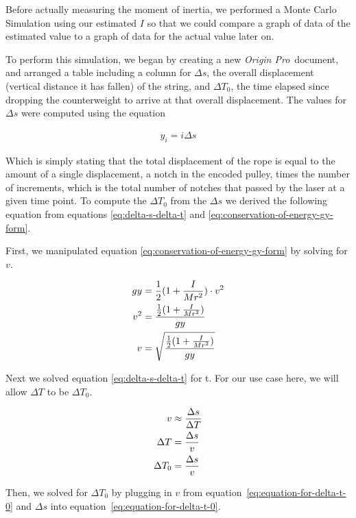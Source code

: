 \documentclass[coverpage]{article}
\newcommand{\softwareText}[1]{\textit{#1}\texttrademark}
\newcommand{\origin}{\softwareText{Origin Pro}}
\begin{document}
	Before actually measuring the moment of inertia, we performed a Monte Carlo Simulation using our estimated $I$ so that we could compare a graph of data of the estimated value to a graph of data for the actual value later on.
	
	To perform this simulation, we began by creating a new \origin~document, and arranged a table including a column for $\Delta{s}$, the overall displacement (vertical distance it has fallen) of the string, and $\Delta{T_0}$, the time elapsed since dropping the counterweight to arrive at that overall displacement. The values for $\Delta{s}$ were computed using the equation
	
	\begin{align}
		y_i=i \Delta{s}
	\end{align}

	Which is simply stating that the total displacement of the rope is equal to the amount of a single displacement, a notch in the encoded pulley, times the number of increments, which is the total number of notches that passed by the laser at a given time point. To compute the $\Delta{T_0}$ from the $\Delta{s}$ we derived the following equation from equations \ref{eq:delta-s-delta-t} and \ref{eq:conservation-of-energy-gy-form}.
	
	First, we manipulated equation \ref{eq:conservation-of-energy-gy-form} by solving for $v$.
	
	\begin{align}
		gy&=\frac{1}{2}(1 + \frac{I}{Mr^2}) \cdot v^2 \notag \\
		v^2&=\frac{\frac{1}{2}(1 + \frac{I}{Mr^2})}{gy} \notag \\
		v&=\sqrt{\frac{\frac{1}{2}(1 + \frac{I}{Mr^2})}{gy}} \label{eq:equation-for-v}
	\end{align}
	
	Next we solved equation \ref{eq:delta-s-delta-t} for t. For our use case here, we will allow $\Delta{T}$ to be $\Delta{T_0}$.
	
	\begin{align}
		v&\approx \frac{\Delta{s}}{\Delta{T}} \notag \\
		\Delta{T}&= \frac{\Delta{s}}{v} \notag \\
		\Delta{T_0}&= \frac{\Delta{s}}{v} \label{eq:equation-for-delta-t-0}
	\end{align}
	
	Then, we solved for $\Delta{T_0}$ by plugging in $v$ from equation~\ref{eq:equation-for-delta-t-0} and $\Delta{s}$ into equation~\ref{eq:equation-for-delta-t-0}.
	
\end{document}
